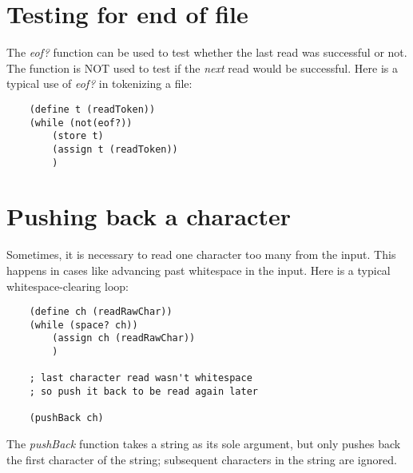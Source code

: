 \section{Testing for end of file}

The {\it eof?} function can be used to test whether the last
read was successful or not. The function is NOT used to
test if the {\it next} read would be successful. Here is a typical
use of {\it eof?} in tokenizing a file:

\begin{verbatim}
    (define t (readToken))
    (while (not(eof?))
        (store t)
        (assign t (readToken))
        )
\end{verbatim}

\section{Pushing back a character}

Sometimes, it is necessary to read one character too
many from the input. This happens in cases like
advancing past whitespace in the input.
Here is a typical whitespace-clearing loop:

\begin{verbatim}
    (define ch (readRawChar))
    (while (space? ch))
        (assign ch (readRawChar))
        )

    ; last character read wasn't whitespace
    ; so push it back to be read again later

    (pushBack ch)
\end{verbatim}

The {\it pushBack} function takes a string as its
sole argument, but only pushes back the first
character of the string; subsequent characters in
the string are ignored.
